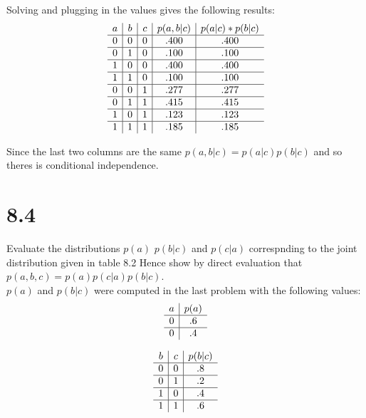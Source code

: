 \documentclass[11pt,leqno,fleqn]{article}
\begin{document}
 Solving and plugging in the values gives the following results:\\
  \[
\begin{array}{ c | c | c | c | c  }
a & b & c &p(a,b|c) &p(a|c)*p(b|c)
   
\\ \hline 
 0 & 0 & 0  & .400 & .400
\\ \hline  
 0 & 1 & 0  & .100 & .100
\\ \hline  
 1 & 0 & 0  & .400 & .400
\\ \hline  
 1 & 1 & 0  & .100 & .100
\\ \hline 
 0 & 0 & 1  & .277 & .277
\\ \hline  
 0 & 1 & 1  & .415 & .415
\\ \hline  
 1 & 0 & 1  & .123 & .123
\\ \hline  
 1 & 1 & 1  & .185  & .185
 
\end{array}
\]

Since the last two columns are the same $p(a,b|c) = p(a|c)p(b|c)$ and so theres is conditional independence.

\newpage
\section{8.4}
Evaluate the distributions $p(a)$ $p(b|c)$ and  $p(c|a)$ correspnding to the joint distribution given in table 8.2 Hence show by direct evaluation that $p(a,b,c) = p(a) p(c|a) p(b|c)$. \\
$p(a)$ and $p(b|c)$ were computed in the last problem with the following values:
 \[
\begin{array}{ c | c    }
a & p(a) 
   
\\ \hline 
 0 & .6 
\\ \hline  
 0 & .4

\end{array}
\]

\[
\begin{array}{ c | c | c  }
b & c &p(b|c)
   
\\ \hline 
 0 & 0 &  .8
\\ \hline  
 0 & 1 &  .2
\\ \hline  
 1 & 0 & .4
\\ \hline  
 1 & 1 & .6
\end{array}
\]
\end{document}
